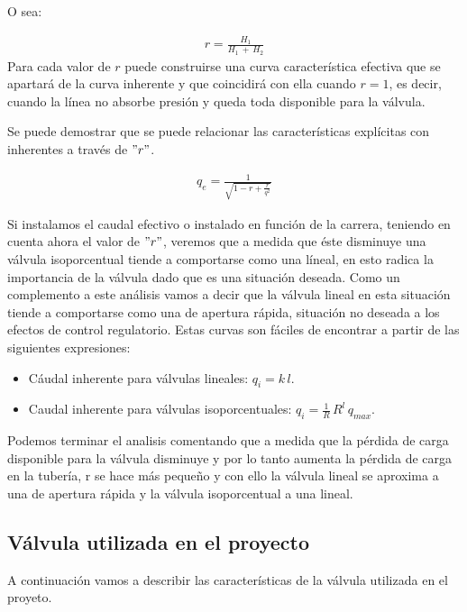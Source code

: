\begin{itemize}
   O sea:
   
   \begin{align}
	r = \frac{H_1}{H_1\,+\,H_2}
    \end{align} 
  Para cada valor de ${r}$ puede construirse una curva característica efectiva que se
  apartará de la curva inherente y que coincidirá con ella cuando ${r=1}$,
  es decir, cuando la línea no absorbe presión y queda toda disponible para la válvula.
  
  Se puede demostrar que se puede relacionar las características explícitas
  con inherentes a través de ${"r"}$.
  
  \begin{align}
	q_e = \frac{1}{\sqrt{1-r+\frac{r}{q^2}}}
  \end{align}
  
  Si instalamos el caudal efectivo o instalado en función de la carrera, teniendo
  en cuenta ahora el valor de ${"r"}$, veremos que a medida que éste disminuye una válvula
  isoporcentual tiende a comportarse como una líneal, en esto radica la importancia
  de la válvula dado que es una situación deseada. Como un complemento a este análisis
  vamos a decir que la válvula lineal en esta situación tiende a comportarse como
  una de apertura rápida, situación no deseada a los efectos de control regulatorio.
  Estas curvas son fáciles de encontrar a partir de las siguientes expresiones:
  
  \begin{itemize}
      \item Cáudal inherente para válvulas lineales: $q_i = k\,l$.
      \item Caudal inherente para válvulas isoporcentuales: $q_i = \frac{1}{R}\,R^l\,q_{max}$.
    \end{itemize}
  Podemos terminar el analisis comentando que a medida que la pérdida de carga disponible
  para la válvula disminuye y por lo tanto aumenta la pérdida de carga en la
  tubería, r se hace más pequeño y con ello la válvula lineal se aproxima a una de apertura rápida
  y la válvula isoporcentual a una lineal.
  
\end{itemize}

\subsection{Válvula utilizada en el proyecto}

A continuación vamos a describir las características de la válvula utilizada 
en el proyeto.

